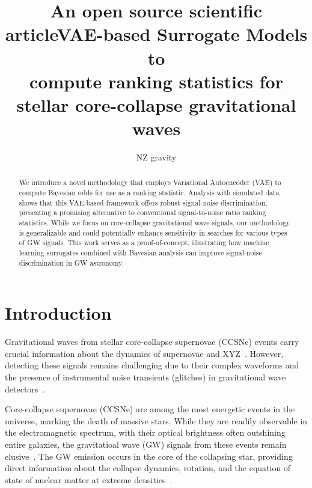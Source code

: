 \documentclass[twocolumn]{aastex631}
\begin{document}
\title{An open source scientific article}
\title{VAE-based Surrogate Models to \\compute ranking statistics for \\stellar core-collapse gravitational waves}

\author{NZ gravity}

\begin{abstract}
    We introduce a novel methodology that employs Variational Autoencoder (VAE) to compute Bayesian odds for use as a ranking statistic. 
    Analysis with simulated data shows that this VAE-based framework offers robust signal-noise discrimination, presenting a promising alternative to conventional signal-to-noise ratio ranking statistics. 
    While we focus on core-collapse gravitational wave signals, our methodology is generalizable and could potentially enhance sensitivity in searches for various types of GW signals. 
    This work serves as a proof-of-concept, illustrating how machine learning surrogates combined with Bayesian analysis can improve signal-noise discrimination in GW astronomy.
\end{abstract}

\section{Introduction}
\label{sec:intro}

Gravitational waves from stellar core-collapse supernovae (CCSNe) events carry crucial information about the dynamics of supernovae and XYZ~\cite{}. 
However, detecting these signals remains challenging due to their complex waveforms and the presence of instrumental noise transients (glitches) in gravitational wave detectors~\cite{}.

Core-collapse supernovae (CCSNe) are among the most energetic events in the universe, marking the death of massive stars. 
While they are readily observable in the electromagnetic spectrum, with their optical brightness often outshining entire galaxies, the gravitatioal wave (GW) signals from these events remain elusive~\cite{}. 
The GW emission occurs in the core of the collapsing star, providing direct information about the collapse dynamics, rotation, and the equation of state of nuclear matter at extreme densities~\cite{}.
\end{document}
